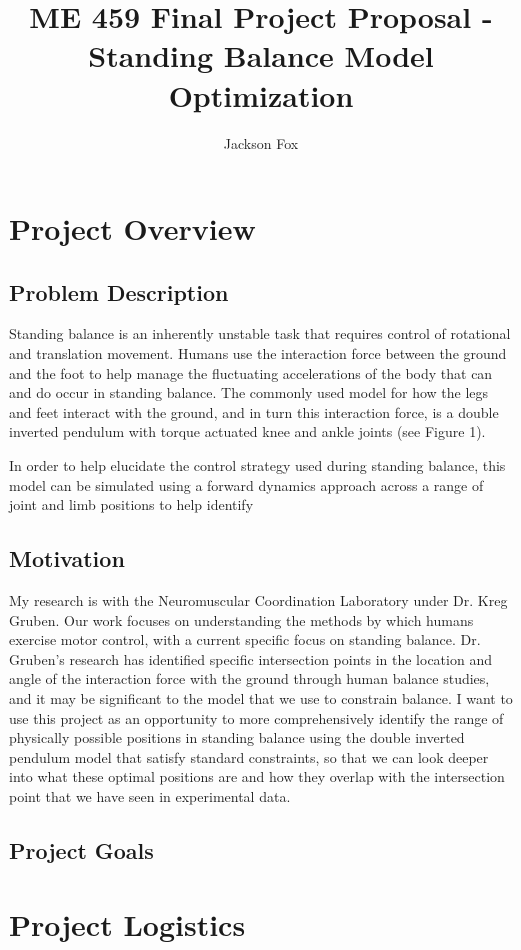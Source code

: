 \documentclass[12pt, oneside]{article}   	%
\title{ME 459 Final Project Proposal - Standing Balance Model Optimization}
\author{Jackson Fox}
\begin{document}
\maketitle
\section{Project Overview}
\subsection{Problem Description}
Standing balance is an inherently unstable task that requires control of rotational and translation movement.  Humans use the interaction force between the ground and the foot to help manage the fluctuating accelerations of the body that can and do occur in standing balance.  The commonly used model for how the legs and feet interact with the ground, and in turn this interaction force, is a double inverted pendulum with torque actuated knee and ankle joints (see Figure 1).


In order to help elucidate the control strategy used during standing balance, this model can be simulated using a forward dynamics approach across a range of joint and limb positions to help identify 

\subsection{Motivation}
My research is with the Neuromuscular Coordination Laboratory under Dr. Kreg Gruben.  Our work focuses on understanding the methods by which humans exercise motor control, with a current specific focus on standing balance.  Dr. Gruben's research has identified specific intersection points in the location and angle of the interaction force with the ground through human balance studies, and it may be significant to the model that we use to constrain balance.  I want to use this project as an opportunity to more comprehensively identify the range of physically possible positions in standing balance using the double inverted pendulum model that satisfy standard constraints, so that we can look deeper into what these optimal positions are and how they overlap with the intersection point that we have seen in experimental data.
\subsection{Project Goals}

\section{Project Logistics}

\subsection{}
\end{document}
